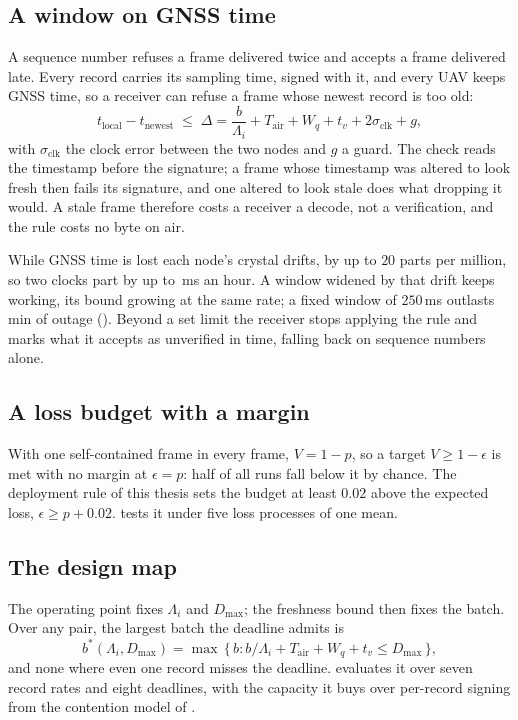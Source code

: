 \subsection{A window on GNSS time}\label{sec:window}

A sequence number refuses a frame delivered twice and accepts a frame delivered late. Every
record carries its sampling time, signed with it, and every UAV keeps GNSS time, so a receiver
can refuse a frame whose newest record is too old:
\begin{equation}
  t_{\mathrm{local}} - t_{\mathrm{newest}} \;\leq\; \Delta =
  \frac{b}{\Lambda_i} + T_{\mathrm{air}} + W_q + t_v + 2\sigma_{\mathrm{clk}} + g,
  \label{eq:window}
\end{equation}
with $\sigma_{\mathrm{clk}}$ the clock error between the two nodes and $g$ a guard. The check
reads the timestamp before the signature; a frame whose timestamp was altered to look fresh then
fails its signature, and one altered to look stale does what dropping it would. A stale frame
therefore costs a receiver a decode, not a verification, and the rule costs no byte on air.

While GNSS time is lost each node's crystal drifts, by up to $20$ parts per million, so two
clocks part by up to \rpDrift\,ms an hour. A window widened by that drift keeps working, its
bound growing at the same rate; a fixed window of $250$\,ms outlasts \rpHolds\,min of outage
(). Beyond a set limit the receiver stops applying the rule and marks what it
accepts as unverified in time, falling back on sequence numbers alone.

\subsection{A loss budget with a margin}\label{sec:margin}

With one self-contained frame in every frame, $V = 1-p$, so a target $V \geq 1-\epsilon$ is met
with no margin at $\epsilon = p$: half of all runs fall below it by chance. The deployment rule
of this thesis sets the budget at least $0.02$ above the expected loss, $\epsilon \geq p + 0.02$.
 tests it under five loss processes of one mean.

\subsection{The design map}\label{sec:design-map}

The operating point fixes $\Lambda_i$ and $D_{\max}$; the freshness bound then fixes the batch.
Over any pair, the largest batch the deadline admits is
\begin{equation}
  b^\ast(\Lambda_i, D_{\max}) = \max\,\{\, b : b/\Lambda_i + T_{\mathrm{air}} + W_q + t_v \leq
  D_{\max} \,\},
  \label{eq:bstar}
\end{equation}
and none where even one record misses the deadline.  evaluates it over seven
record rates and eight deadlines, with the capacity it buys over per-record signing from the
contention model of .
